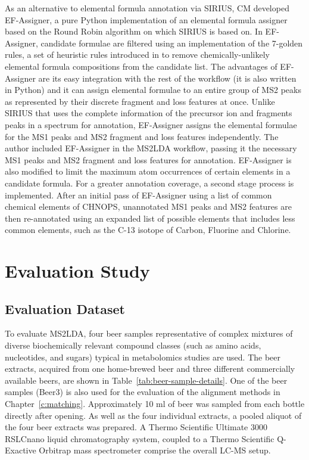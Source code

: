 As an alternative to elemental formula annotation via SIRIUS, CM developed EF-Assigner, a pure Python implementation of an elemental formula assigner based on the Round Robin algorithm on which SIRIUS is based on. In EF-Assigner, candidate formulae are filtered using an implementation of the 7-golden rules, a set of heuristic rules introduced in \cite{Kind2007} to remove chemically-unlikely elemental formula compositions from the candidate list. The advantages of EF-Assigner are its easy integration with the rest of the workflow (it is also written in Python) and it can assign elemental formulae to an entire group of MS2 peaks as represented by their discrete fragment and loss features at once. Unlike SIRIUS that uses the complete information of the precursor ion and fragments peaks in a spectrum for annotation, EF-Assigner assigns the elemental formulae for the MS1 peaks and MS2 fragment and loss features independently. The author included EF-Assigner in the MS2LDA workflow, passing it the necessary MS1 peaks and MS2 fragment and loss features for annotation. EF-Assigner is also modified to limit the maximum atom occurrences of certain elements in a candidate formula. For a greater annotation coverage, a second stage process is implemented. After an initial pass of EF-Assigner using a list of common chemical elements of CHNOPS, unannotated MS1 peaks and MS2 features are then re-annotated using an expanded list of possible elements that includes less common elements, such as the C-13 isotope of Carbon, Fluorine and Chlorine.

\section{Evaluation Study}

\subsection{Evaluation Dataset\label{sub:ms2lda-datasets}}

To evaluate MS2LDA, four beer samples representative of complex mixtures of diverse biochemically relevant compound classes (such as amino acids, nucleotides, and sugars) typical in metabolomics studies are used. The beer extracts, acquired from one home-brewed beer and three different commercially available beers, are shown in Table~\ref{tab:beer-sample-details}. One of the beer samples (Beer3) is also used for the evaluation of the alignment methods in Chapter~\ref{c:matching}. Approximately 10 ml of beer was sampled from each bottle directly after opening. As well as the four individual extracts, a pooled aliquot of the four beer extracts was prepared. A Thermo Scientific Ultimate 3000 RSLCnano liquid chromatography system, coupled to a Thermo Scientific Q-Exactive Orbitrap mass spectrometer comprise the overall LC-MS setup.

